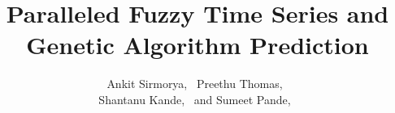 \documentclass[12pt,journal,compsoc]{IEEEtran}
\begin{document}
%
\title{Paralleled Fuzzy Time Series and Genetic Algorithm Prediction}
%
%
%
%

\author{Ankit Sirmorya,~
        Preethu Thomas,~
        \\Shantanu Kande,~
         and Sumeet Pande,~%
}
\end{document}
